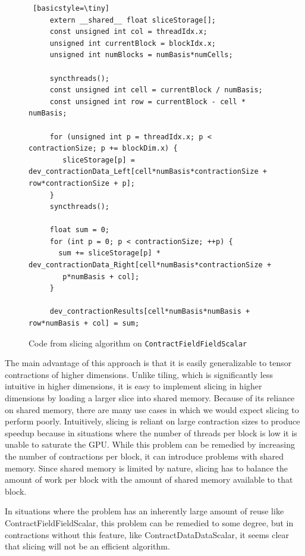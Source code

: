 \begin{figure}[ht]
    \begin{lstlisting} [basicstyle=\tiny]
     extern __shared__ float sliceStorage[];
     const unsigned int col = threadIdx.x;
     unsigned int currentBlock = blockIdx.x;
     unsigned int numBlocks = numBasis*numCells;
     
     syncthreads();
     const unsigned int cell = currentBlock / numBasis;
     const unsigned int row = currentBlock - cell * numBasis;

     for (unsigned int p = threadIdx.x; p < contractionSize; p += blockDim.x) {
        sliceStorage[p] = dev_contractionData_Left[cell*numBasis*contractionSize + row*contractionSize + p];
     }
     syncthreads();

     float sum = 0;
     for (int p = 0; p < contractionSize; ++p) {
       sum += sliceStorage[p] * dev_contractionData_Right[cell*numBasis*contractionSize +
        p*numBasis + col];
     }

     dev_contractionResults[cell*numBasis*numBasis + row*numBasis + col] = sum;
 \end{lstlisting}
\caption{Code from slicing algorithm on \texttt{ContractFieldFieldScalar}
\label{lst:ContractFieldFieldScalarSlice}} 
\end{figure}

	The main advantage of this approach is that it is easily generalizable to tensor contractions of higher dimensions. Unlike tiling, which is significantly less intuitive in higher dimensions, it is easy to implement slicing in higher dimensions by loading a larger slice into shared memory. Because of its reliance on shared memory, there are many use cases in which we would expect slicing to perform poorly. Intuitively, slicing is reliant on large contraction sizes to produce speedup because in situations where the number of threads per block is low it is unable to saturate the GPU. While this problem can be remedied by increasing the number of contractions per block, it can introduce problems with shared memory. Since shared memory is limited by nature, slicing has to balance the amount of work per block with the amount of shared memory available to that block.
	
	In situations where the problem has an inherently large amount of reuse like ContractFieldFieldScalar, this problem can be remedied to some degree, but in contractions without this feature, like ContractDataDataScalar, it seems clear that slicing will not be an efficient algorithm. 
	
